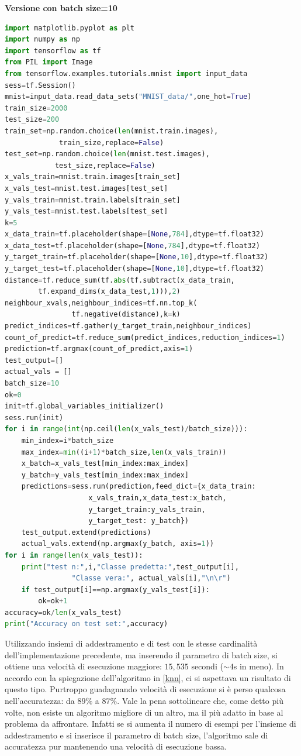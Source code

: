\documentclass[a4paper,12pt,oneside]{book}
\begin{document}
\textbf{Versione con batch size=10}
\begin{lstlisting}[language={Python},tabsize=2]
import matplotlib.pyplot as plt
import numpy as np
import tensorflow as tf
from PIL import Image
from tensorflow.examples.tutorials.mnist import input_data
sess=tf.Session()
mnist=input_data.read_data_sets("MNIST_data/",one_hot=True)
train_size=2000
test_size=200
train_set=np.random.choice(len(mnist.train.images),
			 train_size,replace=False)
test_set=np.random.choice(len(mnist.test.images),
			test_size,replace=False)
x_vals_train=mnist.train.images[train_set]
x_vals_test=mnist.test.images[test_set]
y_vals_train=mnist.train.labels[train_set]
y_vals_test=mnist.test.labels[test_set]
k=5
x_data_train=tf.placeholder(shape=[None,784],dtype=tf.float32)
x_data_test=tf.placeholder(shape=[None,784],dtype=tf.float32)
y_target_train=tf.placeholder(shape=[None,10],dtype=tf.float32)
y_target_test=tf.placeholder(shape=[None,10],dtype=tf.float32)
distance=tf.reduce_sum(tf.abs(tf.subtract(x_data_train,
		tf.expand_dims(x_data_test,1))),2)
neighbour_xvals,neighbour_indices=tf.nn.top_k(
				tf.negative(distance),k=k) 
predict_indices=tf.gather(y_target_train,neighbour_indices)
count_of_predict=tf.reduce_sum(predict_indices,reduction_indices=1)
prediction=tf.argmax(count_of_predict,axis=1)
test_output=[]
actual_vals = []
batch_size=10
ok=0
init=tf.global_variables_initializer()
sess.run(init)
for i in range(int(np.ceil(len(x_vals_test)/batch_size))):
	min_index=i*batch_size
	max_index=min((i+1)*batch_size,len(x_vals_train))
	x_batch=x_vals_test[min_index:max_index]
	y_batch=y_vals_test[min_index:max_index]
	predictions=sess.run(prediction,feed_dict={x_data_train:
					x_vals_train,x_data_test:x_batch,
					y_target_train:y_vals_train,
					y_target_test: y_batch})
	test_output.extend(predictions)
	actual_vals.extend(np.argmax(y_batch, axis=1))
for i in range(len(x_vals_test)):
	print("test n:",i,"Classe predetta:",test_output[i],
				"Classe vera:", actual_vals[i],"\n\r")
	if test_output[i]==np.argmax(y_vals_test[i]):
		ok=ok+1
accuracy=ok/len(x_vals_test)
print("Accuracy on test set:",accuracy)
\end{lstlisting}
Utilizzando insiemi di addestramento e di test con le stesse cardinalit\`{a} dell'implementazione precedente, ma inserendo il parametro di batch size, si ottiene una velocit\`{a} di esecuzione maggiore: $15,535$ secondi ($\sim 4$s in meno). In accordo con la spiegazione dell'algoritmo in \ref{knn}, ci si aspettava un risultato di questo tipo. Purtroppo guadagnando velocit\`{a} di esecuzione si \`{e} perso qualcosa nell'accuratezza: da $89\%$ a $87\%$. Vale la pena sottolineare che, come detto pi\`{u} volte, non esiste un algoritmo migliore di un altro, ma il pi\`{u} adatto in base al problema da affrontare. Infatti se si aumenta il numero di esempi per l'insieme di addestramento e si inserisce il parametro di batch size, l'algoritmo sale di accuratezza pur mantenendo una velocit\`{a} di esecuzione bassa.  

\clearpage
{}


\nocite{deep,machine,imagenet}
\end{document}
